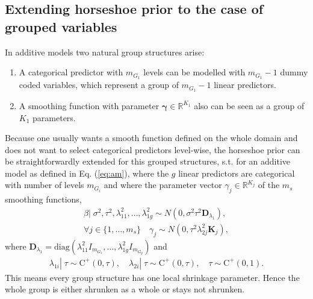 \documentclass[12pt,letterpaper]{article}
\numberwithin{equation}{subsection}
\begin{document}
\subsection{Extending horseshoe prior to the case of grouped variables}
\label{sec:hsg}
In additive models two natural group structures arise:
\begin{enumerate}
\item A categorical predictor with $m_{G_1}$ levels can be modelled with $m_{G_1} -1$ dummy coded variables, which represent a group of $m_{G_1} - 1$ linear predictors.
\item A smoothing function with parameter $\mathbf{\gamma} \in \mathbb{R}^{K_1}$ also can be seen as a group of $K_1$ parameters. 
\end{enumerate}
Because one usually wants a smooth function defined on the whole domain and does not want to select categorical predictors level-wise, the horseshoe prior can be straightforwardly extended for this grouped structures, s.t. for an additive model as defined in Eq. (\ref{eq:am}), where the $g$ linear predictors are categorical with number of levels $m_{G_i}$ and where the parameter vector $\gamma_j \in \mathbb{R}^{K_j}$ of the $m_s$ smoothing functions,
\begin{align}
\beta|\; \sigma^2,\tau^2, \lambda^2_{11},\dots,\lambda^2_{1g} \sim N(0, \sigma^2\tau^2\mathbf{D}_{\lambda_1}),\\
\forall j \in  \{1,\dots,m_s\}\quad \gamma_j  \sim N(0, \tau^2\lambda_{2j}^2\mathbf{K}_j),
\end{align}
where $\mathbf{D}_{\lambda_1} = \text{diag}(\lambda_{11}^2I_{m_{G_1}},\dots,\lambda_{1g}^2I_{m_{G_g}})$ and 
\begin{align*}
\lambda_{1i}|\;\tau \sim \text{C}^+(0,\tau), \quad \lambda_{2i}|\;\tau \sim \text{C}^+(0,\tau), \quad \tau \sim \text{C}^+(0,1).
\end{align*}
This means every group structure has one local shrinkage parameter. Hence the whole group is either shrunken as a whole or stays not shrunken.
\end{document}
